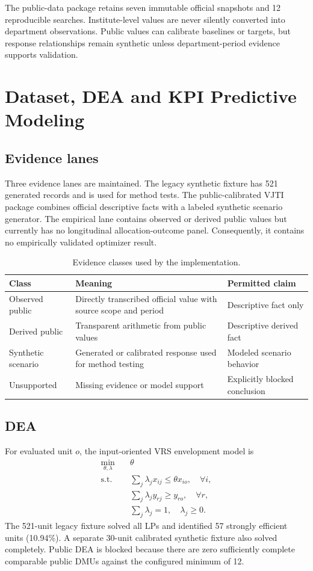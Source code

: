 \documentclass[12pt,a4paper]{report}
\begin{document}
The public-data package retains seven immutable official snapshots and 12 reproducible searches. Institute-level values are never silently converted into department observations. Public values can calibrate baselines or targets, but response relationships remain synthetic unless department-period evidence supports validation.

\chapter{Dataset, DEA and KPI Predictive Modeling}
\section{Evidence lanes}
Three evidence lanes are maintained. The legacy synthetic fixture has 521 generated records and is used for method tests. The public-calibrated VJTI package combines official descriptive facts with a labeled synthetic scenario generator. The empirical lane contains observed or derived public values but currently has no longitudinal allocation-outcome panel. Consequently, it contains no empirically validated optimizer result.

\begin{table}[H]\centering\small
\caption{Evidence classes used by the implementation.}
\begin{tabularx}{\textwidth}{p{}X X}\toprule
Class & Meaning & Permitted claim\\\midrule
Observed public & Directly transcribed official value with source scope and period & Descriptive fact only\\
Derived public & Transparent arithmetic from public values & Descriptive derived fact\\
Synthetic scenario & Generated or calibrated response used for method testing & Modeled scenario behavior\\
Unsupported & Missing evidence or model support & Explicitly blocked conclusion\\\bottomrule
\end{tabularx}
\end{table}

\section{DEA}
For evaluated unit $o$, the input-oriented VRS envelopment model is
\begin{align}
\min_{\theta,\lambda}\quad &\theta\\
\text{s.t.}\quad &\sum_j\lambda_jx_{ij}\leq \theta x_{io},\quad\forall i,\\
&\sum_j\lambda_jy_{rj}\geq y_{ro},\quad\forall r,\\
&\sum_j\lambda_j=1,\quad\lambda_j\geq0.
\end{align}
The 521-unit legacy fixture solved all LPs and identified 57 strongly efficient units (10.94\%). A separate 30-unit calibrated synthetic fixture also solved completely. Public DEA is blocked because there are zero sufficiently complete comparable public DMUs against the configured minimum of 12.
\end{document}
